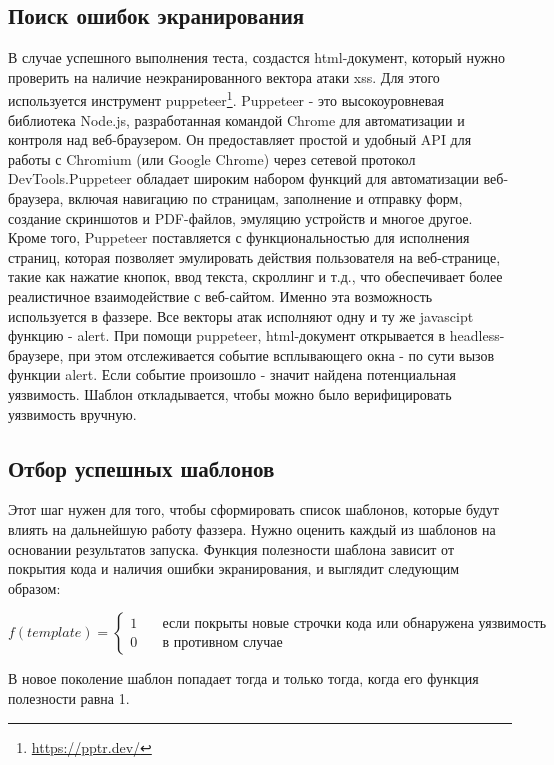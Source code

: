 \documentclass[a4paper]{article}
\begin{document}
\subsection{Поиск ошибок экранирования}

В случае успешного выполнения теста, создастся html-документ, который нужно проверить на наличие неэкранированного вектора атаки xss. Для этого используется инструмент puppeteer\footnote{\href{https://pptr.dev/}{https://pptr.dev/}}. Puppeteer - это высокоуровневая библиотека Node.js, разработанная командой Chrome для автоматизации и контроля над веб-браузером. Он предоставляет простой и удобный API для работы с Chromium (или Google Chrome) через сетевой протокол DevTools.Puppeteer обладает широким набором функций для автоматизации веб-браузера, включая навигацию по страницам, заполнение и отправку форм, создание скриншотов и PDF-файлов, эмуляцию устройств и многое другое. Кроме того, Puppeteer поставляется с функциональностью для исполнения страниц, которая позволяет эмулировать действия пользователя на веб-странице, такие как нажатие кнопок, ввод текста, скроллинг и т.д., что обеспечивает более реалистичное взаимодействие с веб-сайтом. Именно эта возможность используется в фаззере. Все векторы атак исполняют одну и ту же javascipt функцию - alert. При помощи puppeteer, html-документ открывается в headless-браузере, при этом отслеживается событие всплывающего окна - по сути вызов функции alert. Если событие произошло - значит найдена потенциальная уязвимость. Шаблон откладывается, чтобы можно было верифицировать уязвимость вручную. 

\subsection{Отбор успешных шаблонов}

Этот шаг нужен для того, чтобы сформировать список шаблонов, которые будут влиять на дальнейшую работу фаззера. Нужно оценить каждый из шаблонов на основании результатов запуска. Функция полезности шаблона зависит от покрытия кода и наличия ошибки экранирования, и выглядит следующим образом:

\[
f(template) = 
\begin{cases}
    1 & \quad \text{если покрыты новые строчки кода или обнаружена уязвимость}\\
    0 & \quad \text{в противном случае}
\end{cases}
\]

В новое поколение шаблон попадает тогда и только тогда, когда его функция полезности равна 1.
\end{document}
